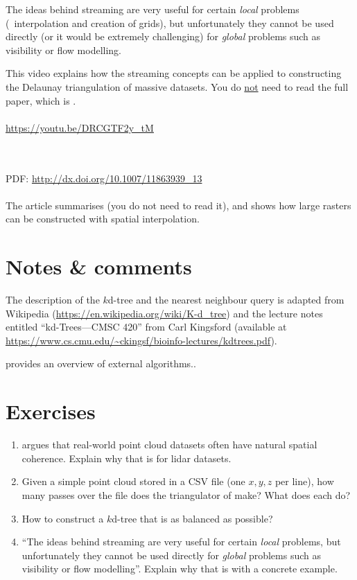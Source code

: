 The ideas behind streaming are very useful for certain \emph{local} problems (\eg\ interpolation and creation of grids), but unfortunately they cannot be used directly (or it would be extremely challenging) for \emph{global} problems such as visibility or flow modelling.

\begin{kaobox}[frametitle=\faExternalLink\ To read or to watch.]
  This video explains how the streaming concepts can be applied to constructing the Delaunay triangulation of massive datasets.
  You do \underline{not} need to read the full paper, which is \citet{Isenburg06}.
  \\ \\
  \url{https://youtu.be/DRCGTF2y_tM}
\end{kaobox}

\begin{kaobox}[frametitle=\faExternalLink\ To read or to watch.]
  \\ \\
  PDF: \url{http://dx.doi.org/10.1007/11863939_13}
  \\ \\
  The article summarises \citet{Isenburg06} (you do not need to read it), and shows how large rasters can be constructed with spatial interpolation.
\end{kaobox}


%
\section{Notes \& comments}

The description of the $k$d-tree and the nearest neighbour query is adapted from Wikipedia (\url{https://en.wikipedia.org/wiki/K-d_tree}) and the lecture notes entitled ``kd-Trees---CMSC 420'' from Carl Kingsford (available at \url{https://www.cs.cmu.edu/~ckingsf/bioinfo-lectures/kdtrees.pdf}).

\citet{Vitter01} provides an overview of external algorithms..


%
\section{Exercises}

\begin{enumerate}
  \item \citet{Isenburg06-1} argues that real-world point cloud datasets often have natural spatial coherence. Explain why that is for lidar datasets.
  \item Given a simple point cloud stored in a CSV file (one $x,y,z$ per line), how many passes over the file does the triangulator of \citet{Isenburg06-1} make? What does each do?
  \item How to construct a $k$d-tree that is as balanced as possible?
  \item ``The ideas behind streaming are very useful for certain \emph{local} problems, but unfortunately they cannot be used directly for \emph{global} problems such as visibility or flow modelling''. Explain why that is with a concrete example.
\end{enumerate}
